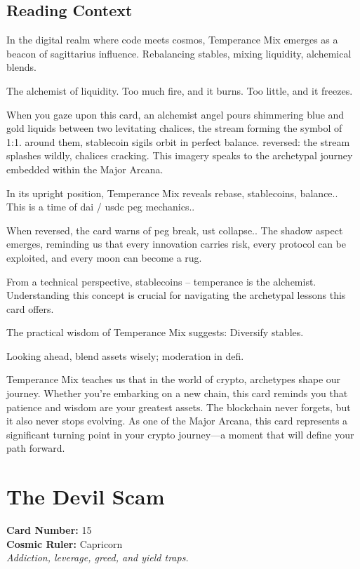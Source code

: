 \documentclass[11pt,oneside]{book}
\begin{document}
\begin{minipage}[t]{0.55\textwidth}
  \subsection*{Reading Context}
  In the digital realm where code meets cosmos, Temperance Mix emerges as a beacon of sagittarius influence. Rebalancing stables, mixing liquidity, alchemical blends.

  The alchemist of liquidity. Too much fire, and it burns. Too little, and it freezes.

  When you gaze upon this card, an alchemist angel pours shimmering blue and gold liquids between two levitating chalices, the stream forming the symbol of 1:1. around them, stablecoin sigils orbit in perfect balance. reversed: the stream splashes wildly, chalices cracking. This imagery speaks to the archetypal journey embedded within the Major Arcana.

  In its upright position, Temperance Mix reveals rebase, stablecoins, balance.. This is a time of dai / usdc peg mechanics..

  When reversed, the card warns of peg break, ust collapse.. The shadow aspect emerges, reminding us that every innovation carries risk, every protocol can be exploited, and every moon can become a rug.

  From a technical perspective, stablecoins – temperance is the alchemist. Understanding this concept is crucial for navigating the archetypal lessons this card offers.

  The practical wisdom of Temperance Mix suggests: Diversify stables.

  Looking ahead, blend assets wisely; moderation in defi.

  Temperance Mix teaches us that in the world of crypto, archetypes shape our journey. Whether you're embarking on a new chain, this card reminds you that patience and wisdom are your greatest assets. The blockchain never forgets, but it also never stops evolving. As one of the Major Arcana, this card represents a significant turning point in your crypto journey—a moment that will define your path forward.

\end{minipage}

\newpage
\section*{The Devil Scam}

\begin{minipage}[t]{0.55\textwidth}
  \vspace{0pt}
  \textbf{Card Number:} 15\\  \textbf{Cosmic Ruler:} Capricorn\\  \textit{Addiction, leverage, greed, and yield traps.}
\end{minipage}
\end{document}
